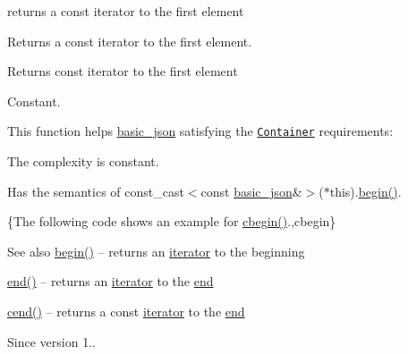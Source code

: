 returns a const iterator to the first element 

Returns a const iterator to the first element.

 \begin{DoxyReturn}{Returns}
const iterator to the first element
\end{DoxyReturn}
Constant.

This function helps {\ttfamily \hyperlink{classnlohmann_1_1basic__json}{basic\+\_\+json}} satisfying the \href{https://en.cppreference.com/w/cpp/named_req/Container}{\tt Container} requirements\+:
\begin{DoxyItemize}
\item The complexity is constant.
\item Has the semantics of {\ttfamily const\+\_\+cast$<$const \hyperlink{classnlohmann_1_1basic__json}{basic\+\_\+json}\&$>$($\ast$this).\hyperlink{classnlohmann_1_1basic__json_a23b495b4c282e4afacf382f5b49af7c7}{begin()}}.
\end{DoxyItemize}

\{The following code shows an example for {\ttfamily \hyperlink{classnlohmann_1_1basic__json_ae508c13e3ad6ce445bcaf24a2bc7d039}{cbegin()}}.,cbegin\}

\begin{DoxySeeAlso}{See also}
\hyperlink{classnlohmann_1_1basic__json_a23b495b4c282e4afacf382f5b49af7c7}{begin()} -- returns an \hyperlink{classnlohmann_1_1basic__json_aa549b2b382916b3baafb526e5cb410bd}{iterator} to the beginning 

\hyperlink{classnlohmann_1_1basic__json_a931267ec3f09eb67e4382f321b2c52bc}{end()} -- returns an \hyperlink{classnlohmann_1_1basic__json_aa549b2b382916b3baafb526e5cb410bd}{iterator} to the \hyperlink{classnlohmann_1_1basic__json_a931267ec3f09eb67e4382f321b2c52bc}{end} 

\hyperlink{classnlohmann_1_1basic__json_a3017cf0f1a4673e904e34cfef62e7758}{cend()} -- returns a const \hyperlink{classnlohmann_1_1basic__json_aa549b2b382916b3baafb526e5cb410bd}{iterator} to the \hyperlink{classnlohmann_1_1basic__json_a931267ec3f09eb67e4382f321b2c52bc}{end}
\end{DoxySeeAlso}
\begin{DoxySince}{Since}
version 1.. 
\end{DoxySince}
